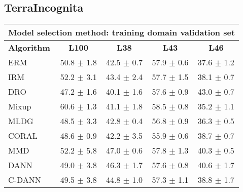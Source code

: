 \documentclass{article}
\begin{document}
\subsection{TerraIncognita}
\begin{center}
\begin{tabular}{lcccc}
\toprule
\multicolumn{5}{c}{\textbf{Model selection method: training domain validation set}} \\
\midrule
\textbf{Algorithm}    & \textbf{L100}             & \textbf{L38}              & \textbf{L43}              & \textbf{L46}              \\
\midrule
ERM                       & 50.8 $\pm$ 1.8            & 42.5 $\pm$ 0.7            & 57.9 $\pm$ 0.6            & 37.6 $\pm$ 1.2            \\
IRM                       & 52.2 $\pm$ 3.1            & 43.4 $\pm$ 2.4            & 57.7 $\pm$ 1.5            & 38.1 $\pm$ 0.7            \\
DRO                 & 47.2 $\pm$ 1.6            & 40.1 $\pm$ 1.6            & 57.6 $\pm$ 0.9            & 43.0 $\pm$ 0.7            \\
Mixup                     & 60.6 $\pm$ 1.3            & 41.1 $\pm$ 1.8            & 58.5 $\pm$ 0.8            & 35.2 $\pm$ 1.1            \\
MLDG                      & 48.5 $\pm$ 3.3            & 42.8 $\pm$ 0.4            & 56.8 $\pm$ 0.9            & 36.3 $\pm$ 0.5            \\
CORAL                     & 48.6 $\pm$ 0.9            & 42.2 $\pm$ 3.5            & 55.9 $\pm$ 0.6            & 38.7 $\pm$ 0.7            \\
MMD                       & 52.2 $\pm$ 5.8            & 47.0 $\pm$ 0.6            & 57.8 $\pm$ 1.3            & 40.3 $\pm$ 0.5            \\
DANN                       & 49.0 $\pm$ 3.8            & 46.3 $\pm$ 1.7            & 57.6 $\pm$ 0.8            & 40.6 $\pm$ 1.7            \\
C-DANN                   & 49.5 $\pm$ 3.8            & 44.8 $\pm$ 1.0            & 57.3 $\pm$ 1.1            & 38.8 $\pm$ 1.7            \\
\bottomrule
\end{tabular}
\end{center}
\end{document}
